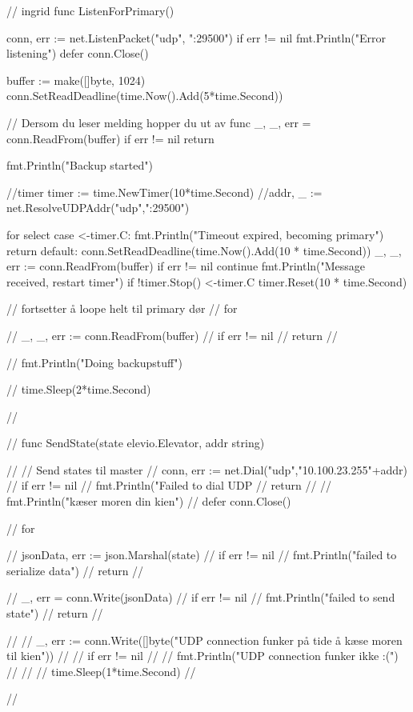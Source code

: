 // ingrid
func ListenForPrimary() {
    conn, err := net.ListenPacket("udp", ":29500")
    if err != nil {
        fmt.Println("Error listening")
    }
    defer conn.Close()

    buffer := make([]byte, 1024)
    conn.SetReadDeadline(time.Now().Add(5*time.Second))

    // Dersom du leser melding hopper du ut av func
    _, _, err = conn.ReadFrom(buffer)
    if err != nil {
        return
    }

    fmt.Println("Backup started")

    //timer
    timer := time.NewTimer(10*time.Second)
    //addr, _ := net.ResolveUDPAddr("udp",":29500")

    for {
        select {
        case <-timer.C:
            fmt.Println("Timeout expired, becoming primary")
            return
        default:
            conn.SetReadDeadline(time.Now().Add(10 * time.Second))
            _, _, err := conn.ReadFrom(buffer)
            if err != nil {
                continue
            }
            fmt.Println("Message received, restart timer")
            if !timer.Stop() {
                <-timer.C
            }
            timer.Reset(10 * time.Second)
        }
    }

    // fortsetter å loope helt til primary dør
    // for {
    //     _, _, err := conn.ReadFrom(buffer)
    //     if err != nil {
    //         return
    //     }

    //     fmt.Println("Doing backupstuff")

    //     time.Sleep(2*time.Second)

    // }

}


// func SendState(state elevio.Elevator, addr string) {

// 	// Send states til master
// 	conn, err := net.Dial("udp","10.100.23.255"+addr)
// 	if err != nil {
// 		fmt.Println("Failed to dial UDP %
// 		return
// 	}
// 	fmt.Println("kæser moren din kien")
// 	defer conn.Close()

// 	for {

// 	jsonData, err := json.Marshal(state)
// 	if err != nil {
// 		fmt.Println("failed to serialize data")
// 		return
// 	}

// 	_, err = conn.Write(jsonData)
// 	if err != nil {
// 		fmt.Println("failed to send state")
// 		return
// 	}

// 	// _, err := conn.Write([]byte("UDP connection funker på tide å kæse moren til kien"))
// 	// if err != nil {
// 	// 	fmt.Println("UDP connection funker ikke :(")
// 	// }
// 	time.Sleep(1*time.Second)
//  }
// }


